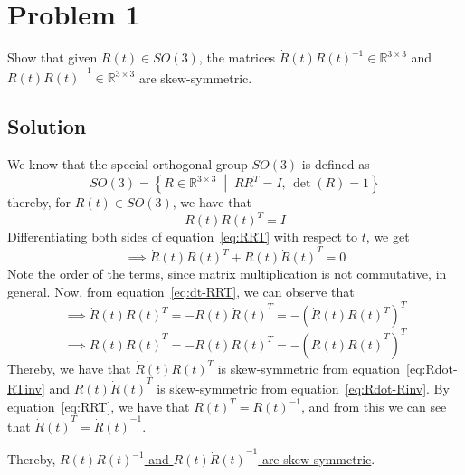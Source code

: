 \section*{Problem 1}
\setcounter{section}{1}

Show that given \( R(t) \in SO(3) \), the matrices \( \dot{R}(t) {R(t)}^{-1} \in \mathbb{R}^{3 \times 3} \) and \( R(t) {\dot{R}(t)}^{-1} \in \mathbb{R}^{3 \times 3} \) are skew-symmetric.

\subsection*{Solution}

We know that the special orthogonal group \( SO(3) \) is defined as
\begin{equation*}
    SO(3) = \left \{ R \in \mathbb{R}^{3 \times 3} \; \middle| \; R R^{T} = I, \, \det(R) = 1 \right \}
\end{equation*}
thereby, for \( R(t) \in SO(3) \), we have that
\begin{equation}\label{eq:RRT}
    R(t) {R(t)}^{T} = I
\end{equation}
Differentiating both sides of equation~\eqref{eq:RRT} with respect to \( t \), we get
\begin{equation}\label{eq:dt-RRT}
    \implies
    \dot{R}(t) {R(t)}^{T}
    + R(t) {\dot{R}(t)}^{T}
    = 0
\end{equation}
Note the order of the terms, since matrix multiplication is not commutative, in general.
Now, from equation~\eqref{eq:dt-RRT}, we can observe that
\begin{equation}\label{eq:Rdot-RTinv}
    \implies
    \dot{R}(t) {R(t)}^{T}
    =
    -R(t) {\dot{R}(t)}^{T}
    =
    - {\left( \dot{R}(t) {R(t)}^{T} \right)}^{T}
\end{equation}
\begin{equation}\label{eq:Rdot-Rinv}
    \implies
    R(t) {\dot{R}(t)}^{T}
    =
    -\dot{R}(t) {R(t)}^{T}
    =
    - {\left( R(t) {\dot{R}(t)}^{T} \right)}^{T}
\end{equation}
Thereby, we have that \( \dot{R}(t) {R(t)}^{T} \) is skew-symmetric from equation~\eqref{eq:Rdot-RTinv} and \( R(t) {\dot{R}(t)}^{T} \) is skew-symmetric from equation~\eqref{eq:Rdot-Rinv}.
By equation~\eqref{eq:RRT}, we have that \( {R(t)}^{T} = {R(t)}^{-1} \), and from this we can see that \( {\dot{R}(t)}^{T} = {\dot{R}(t)}^{-1} \).

Thereby, \underline{\( \dot{R}(t) {R(t)}^{-1} \) and \( R(t) {\dot{R}(t)}^{-1} \) are skew-symmetric}.
